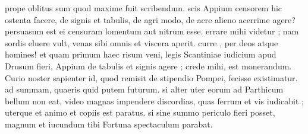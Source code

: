  prope oblitus sum quod maxime fuit scribendum. scis Appium censorem hic ostenta facere, de signis et tabulis, de agri modo, de acre alieno acerrime agere? persuasum est ei censuram lomentum aut nitrum esse. errare mihi videtur ; nam sordis eluere vult, venas sibi omnis et viscera aperit. curre , per deos atque homines! et quam primum haec risum veni, legis Scantiniae iudicium apud Drusum fieri, Appium de tabulis et signis agere ; crede mihi, est monerandum. Curio noster sapienter id, quod remisit de stipendio Pompei, fecisse existimatur. ad summam, quaeris quid putem futurum. si alter uter eorum ad Parthicum bellum non eat, video magnas impendere discordias, quas ferrum et vis iudicabit ; uterque et animo et copiis est paratus. si sine summo periculo fieri posset, magnum et iucundum tibi Fortuna spectaculum parabat.
